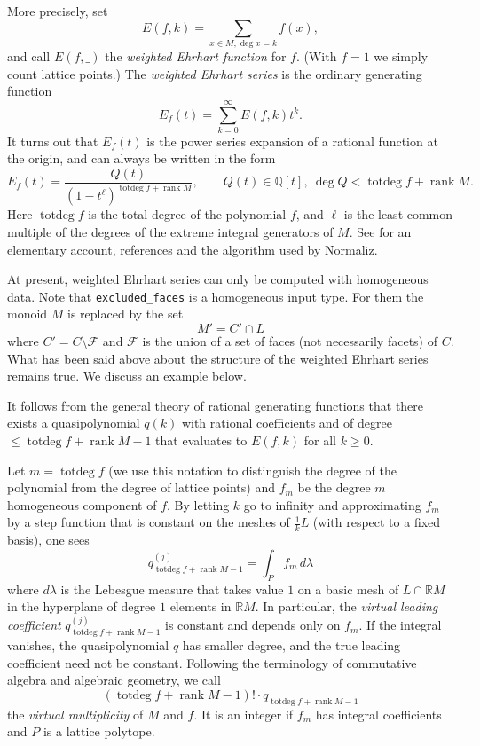\documentclass[12pt,a4paper]{scrartcl}
\theoremstyle{definition}
\def\QQ{{\mathbb Q}}
\def\RR{{\mathbb R}}
\DeclareMathOperator{\rank}{rank}
\DeclareMathOperator{\totdeg}{totdeg}
\begin{document}
{More precisely, set
$$
E(f,k)=\sum_{x\in M, \deg x=k} f(x),
$$
and call $E(f,\_)$ the \emph{weighted Ehrhart function} for
$f$. (With $f=1$ we simply count lattice points.) The
\emph{weighted Ehrhart series} is the ordinary generating
function
$$
E_f(t)=\sum_{k=0}^\infty E(f,k)t^k.
$$
It turns out that $E_f(t)$ is the power series expansion of a
rational function at the origin, and can always be written in
the form
$$
E_f(t)=\frac{Q(t)}{(1-t^\ell)^{\totdeg f+\rank M}},\qquad Q(t)\in\QQ[t],\
\deg Q< \totdeg f+\rank M.
$$
Here $\totdeg f$ is the total degree of the polynomial $f$, and
$\ell$ is the least common  multiple of the degrees of the
extreme integral generators of $M$. See \cite{BS} for an
elementary account, references and the algorithm used by Normaliz.

At present, weighted Ehrhart series can only be computed  with homogeneous data. Note that \verb|excluded_faces| is a homogeneous input type. For them the monoid $M$ is replaced by the set
$$
M'=C'\cap L
$$
where $C'=C\setminus \mathcal F$ and $\mathcal F$ is the union of a set of
faces
(not necessarily facets) of $C$. What has been said above about the structure
of the weighted Ehrhart series remains true. We discuss an example below.

It follows from the general theory of rational generating
functions that there exists a quasipolynomial $q(k)$ with
rational coefficients and of degree $\le \totdeg f+\rank M-1$ that
evaluates to $E(f,k)$ for all $k\ge 0$.

Let $m=\totdeg f$ (we use this notation to distinguish the degree of the polynomial from the degree of lattice points) and $f_m$ be the degree $m$ homogeneous
component of $f$. By letting $k$ go to infinity and
approximating $f_m$ by a step function that is constant on the
meshes of $\frac 1kL$ (with respect to a fixed basis), one sees
$$
q^{(j)}_{\totdeg f+\rank M-1}=\int_P f_m\, d\lambda
$$
where $d\lambda$ is the Lebesgue measure that takes value $1$
on a basic mesh of $L\cap \RR M$ in the hyperplane of degree
$1$ elements in $\RR M$. In particular, the \emph{virtual
	leading coefficient} $q^{(j)}_{\totdeg f+\rank M-1}$ is
constant and depends only on $f_m$. If the integral vanishes,
the quasipolynomial $q$ has smaller degree, and the true
leading coefficient need not be constant. Following the
terminology of commutative algebra and algebraic geometry, we
call
$$
(\totdeg f+\rank M-1)!\cdot q_{\totdeg f+\rank M-1}
$$
the \emph{virtual multiplicity} of $M$ and $f$. It is an
integer if $f_m$ has integral coefficients and $P$ is a lattice
polytope.

}
\end{document}
